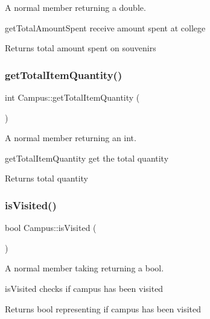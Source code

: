 A normal member returning a double. 

get\+Total\+Amount\+Spent receive amount spent at college \begin{DoxyReturn}{Returns}
total amount spent on souvenirs 
\end{DoxyReturn}
\mbox{\label{class_campus_ac45d0728007e07587761b0fe28e3d959}} 
\subsubsection{\texorpdfstring{get\+Total\+Item\+Quantity()}{getTotalItemQuantity()}}
{\footnotesize\ttfamily int Campus\+::get\+Total\+Item\+Quantity (\begin{DoxyParamCaption}{ }\end{DoxyParamCaption})}



A normal member returning an int. 

get\+Total\+Item\+Quantity get the total quantity \begin{DoxyReturn}{Returns}
total quantity 
\end{DoxyReturn}
\mbox{\label{class_campus_aa033579f18b429b55589d43da459a571}} 
\subsubsection{\texorpdfstring{is\+Visited()}{isVisited()}}
{\footnotesize\ttfamily bool Campus\+::is\+Visited (\begin{DoxyParamCaption}{ }\end{DoxyParamCaption})}



A normal member taking returning a bool. 

is\+Visited checks if campus has been visited \begin{DoxyReturn}{Returns}
bool representing if campus has been visited 
\end{DoxyReturn}
\mbox{\label{class_campus_ae95241376c7252193d7960b22572e211}} 
